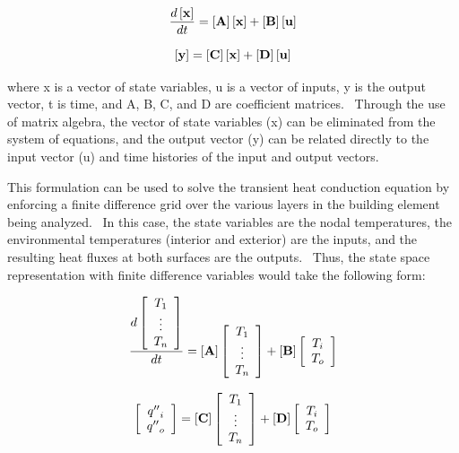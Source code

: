 \begin{equation}
\frac{{d\left[ {\bf{x}} \right]}}{{dt}} = \left[ {\bf{A}} \right]\left[ {\bf{x}} \right] + \left[ {\bf{B}} \right]\left[ {\bf{u}} \right]
\end{equation}

\begin{equation}
\left[ {\bf{y}} \right] = \left[ {\bf{C}} \right]\left[ {\bf{x}} \right] + \left[ {\bf{D}} \right]\left[ {\bf{u}} \right]
\end{equation}

where x is a vector of state variables, u is a vector of inputs, y is the output vector, t is time, and A, B, C, and D are coefficient matrices.~ Through the use of matrix algebra, the vector of state variables (x) can be eliminated from the system of equations, and the output vector (y) can be related directly to the input vector (u) and time histories of the input and output vectors.

This formulation can be used to solve the transient heat conduction equation by enforcing a finite difference grid over the various layers in the building element being analyzed.~ In this case, the state variables are the nodal temperatures, the environmental temperatures (interior and exterior) are the inputs, and the resulting heat fluxes at both surfaces are the outputs.~ Thus, the state space representation with finite difference variables would take the following form:

\begin{equation}
\frac{d\left[\begin{array}{c}T_1 \\ \vdots \\ T_n\end{array}\right]}{dt} = \left[\bf{A}\right]\left[\begin{array}{c}T_1 \\ \vdots \\ T_n\end{array}\right]+\left[\bf{B}\right]\left[\begin{array}{c}T_i \\ T_o\end{array}\right]
\end{equation}

\begin{equation}
\left[\begin{array}{c}{q''}_i \\ {q''}_o\end{array}\right] = \left[\bf{C}\right]\left[\begin{array}{c}T_1 \\ \vdots \\ T_n\end{array}\right]+\left[\bf{D}\right]\left[\begin{array}{c}T_i \\ T_o\end{array}\right]
\end{equation}

